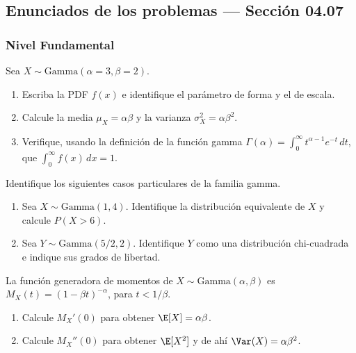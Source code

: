 
\subsection*{Enunciados de los problemas --- Sección 04.07}

\subsubsection*{Nivel Fundamental}

\begin{problema}
	\label{prob:4.7.1}
	Sea $X \sim \text{Gamma}(\alpha=3, \beta=2)$.
	\begin{enumerate}
		\item Escriba la PDF $f(x)$ e identifique el parámetro de forma y el de escala.
		\item Calcule la media $\mu_X = \alpha\beta$ y la varianza $\sigma_X^{2} = \alpha\beta^{2}$.
		\item Verifique, usando la definición de la función gamma $\Gamma(\alpha) = \int_0^\infty t^{\alpha-1}e^{-t}\,dt$, que $\int_0^\infty f(x)\,dx = 1$.
	\end{enumerate}
\end{problema}

\begin{problema}
	\label{prob:4.7.2}
	Identifique los siguientes casos particulares de la familia gamma.
	\begin{enumerate}
		\item Sea $X \sim \text{Gamma}(1, 4)$. Identifique la distribución equivalente de $X$ y calcule $P(X > 6)$.
		\item Sea $Y \sim \text{Gamma}(5/2, 2)$. Identifique $Y$ como una distribución chi-cuadrada e indique sus grados de libertad.
	\end{enumerate}
\end{problema}

\begin{problema}
	\label{prob:4.7.3}
	La función generadora de momentos de $X \sim \text{Gamma}(\alpha, \beta)$ es $M_{X}(t) = (1-\beta t)^{-\alpha}$, para $t < 1/\beta$.
	\begin{enumerate}
		\item Calcule $M_{X}'(0)$ para obtener $\E[X] = \alpha\beta$.
		\item Calcule $M_{X}''(0)$ para obtener $\E[X^{2}]$ y de ahí $\Var(X) = \alpha\beta^{2}$.
	\end{enumerate}
\end{problema}


